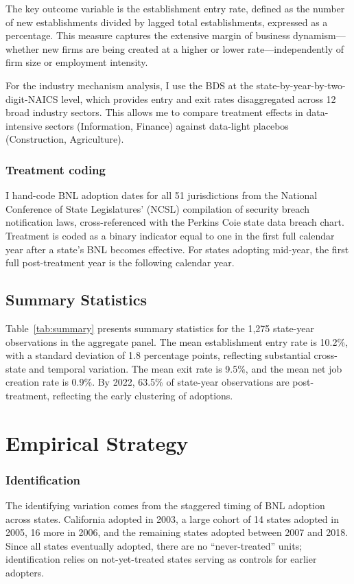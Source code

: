 \documentclass[12pt]{article}
\begin{document}
The key outcome variable is the establishment entry rate, defined as the number of new establishments divided by lagged total establishments, expressed as a percentage. This measure captures the extensive margin of business dynamism---whether new firms are being created at a higher or lower rate---independently of firm size or employment intensity.

For the industry mechanism analysis, I use the BDS at the state-by-year-by-two-digit-NAICS level, which provides entry and exit rates disaggregated across 12 broad industry sectors. This allows me to compare treatment effects in data-intensive sectors (Information, Finance) against data-light placebos (Construction, Agriculture).

\subsubsection*{Treatment coding} I hand-code BNL adoption dates for all 51 jurisdictions from the National Conference of State Legislatures' (NCSL) compilation of security breach notification laws, cross-referenced with the Perkins Coie state data breach chart. Treatment is coded as a binary indicator equal to one in the first full calendar year after a state's BNL becomes effective. For states adopting mid-year, the first full post-treatment year is the following calendar year.

\subsection{Summary Statistics}



Table~\ref{tab:summary} presents summary statistics for the 1,275 state-year observations in the aggregate panel. The mean establishment entry rate is 10.2\%, with a standard deviation of 1.8 percentage points, reflecting substantial cross-state and temporal variation. The mean exit rate is 9.5\%, and the mean net job creation rate is 0.9\%. By 2022, 63.5\% of state-year observations are post-treatment, reflecting the early clustering of adoptions.


\section{Empirical Strategy}

\subsubsection*{Identification} The identifying variation comes from the staggered timing of BNL adoption across states. California adopted in 2003, a large cohort of 14 states adopted in 2005, 16 more in 2006, and the remaining states adopted between 2007 and 2018. Since all states eventually adopted, there are no ``never-treated'' units; identification relies on not-yet-treated states serving as controls for earlier adopters.
\end{document}
